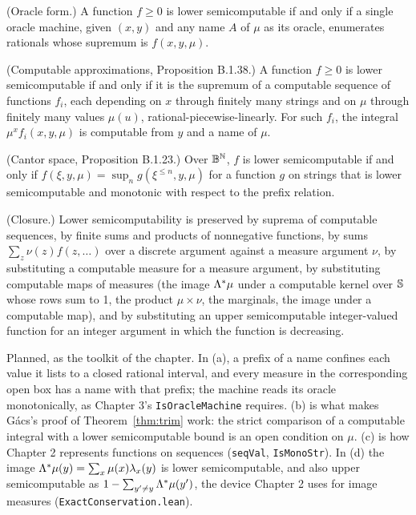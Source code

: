 \begin{ourtheorem}\label{our:lsc-props}
 \begin{alphenum}
  \item (Oracle form.) A function \( f\ge 0 \) is lower semicomputable if and only if a single
oracle machine, given \( (x,y) \) and any name \( A \) of \( \mu \) as its oracle, enumerates
rationals whose supremum is \( f(x,y,\mu) \).
  \item (Computable approximations, Proposition B.1.38.) A function \( f\ge 0 \) is lower
semicomputable if and only if it is the supremum of a computable sequence of functions
\( f_{i} \), each depending on \( x \) through finitely many strings and on \( \mu \) through
finitely many values \( \mu(u) \), rational-piecewise-linearly.
For such \( f_{i} \), the integral \( \mu^{x}f_{i}(x,y,\mu) \) is computable from \( y \) and a
name of \( \mu \).
  \item (Cantor space, Proposition B.1.23.) Over \( \mathbb{B}^{\mathbb{N}} \), \( f \) is lower
semicomputable if and only if \( f(\xi,y,\mu) = \sup_{n}g(\xi^{\le n},y,\mu) \) for a function
\( g \) on strings that is lower semicomputable and monotonic with respect to the prefix
relation.
  \item (Closure.) Lower semicomputability is preserved by suprema of computable sequences, by
finite sums and products of nonnegative functions, by sums \( \sum_{z}\nu(z)f(z,\dots) \) over a
discrete argument against a measure argument \( \nu \), by substituting a computable measure for
a measure argument, by substituting computable maps of measures (the image \( \Lambda^{*}\mu \) under
a computable kernel over \( \mathbb{S} \) whose rows sum to 1, the product \( \mu\times\nu \), the
marginals, the image under a computable map), and by substituting an upper semicomputable
integer-valued function for an integer argument in which the function is decreasing.
 \end{alphenum}
\end{ourtheorem}

\begin{formalization}
Planned, as the toolkit of the chapter. In (a), a prefix of a name confines each value it lists
to a closed rational interval, and every measure in the corresponding open box has a name with
that prefix; the machine reads its oracle monotonically, as Chapter 3's \texttt{IsOracleMachine}
requires. (b) is what makes G\'acs's proof of Theorem~\ref{thm:trim} work: the strict comparison
of a computable integral with a lower semicomputable bound is an open condition on $\mu$. (c) is
how Chapter 2 represents functions on sequences (\texttt{seqVal}, \texttt{IsMonoStr}). In (d) the
image $\Lambda^{*}\mu(y) = \sum_{x}\mu(x)\lambda_{x}(y)$ is lower semicomputable, and also upper
semicomputable as $1-\sum_{y'\ne y}\Lambda^{*}\mu(y')$, the device Chapter 2 uses for image measures
(\texttt{ExactConservation.lean}).
\end{formalization}

